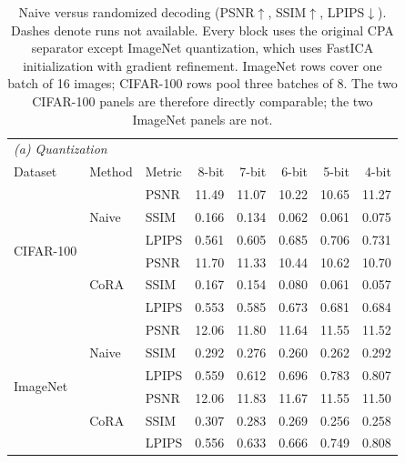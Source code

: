 \documentclass{article}
\newcommand{\cora}{CoRA}
\begin{document}
\begin{table}[!t]
\centering
\caption{Naive versus randomized decoding (PSNR$\uparrow$, SSIM$\uparrow$,
LPIPS$\downarrow$). Dashes denote runs not available. Every block uses the
original CPA separator except ImageNet quantization, which uses FastICA
initialization with gradient refinement. ImageNet rows cover one batch of 16
images; CIFAR-100 rows pool three batches of 8. The two CIFAR-100 panels are
therefore directly comparable; the two ImageNet panels are not.}
\label{tab:compression}
\small
\setlength{\tabcolsep}{0.5pt}
\renewcommand{\arraystretch}{1.0}

\begin{tabular*}{\columnwidth}{@{\extracolsep{\fill}}lllrrrrr@{}}
\toprule
\multicolumn{8}{l}{\textit{(a) Quantization}}\\
Dataset & Method & Metric & 8-bit & 7-bit & 6-bit & 5-bit & 4-bit\\
\midrule
\multirow{6}{*}{CIFAR-100} & \multirow{3}{*}{Naive} & PSNR & 11.49 & 11.07 & 10.22 & 10.65 & 11.27\\
 &  & SSIM & 0.166 & 0.134 & 0.062 & 0.061 & 0.075\\
 &  & LPIPS & 0.561 & 0.605 & 0.685 & 0.706 & 0.731\\
 & \multirow{3}{*}{\cora{}} & PSNR & 11.70 & 11.33 & 10.44 & 10.62 & 10.70\\
 &  & SSIM & 0.167 & 0.154 & 0.080 & 0.061 & 0.057\\
 &  & LPIPS & 0.553 & 0.585 & 0.673 & 0.681 & 0.684\\
\midrule
\multirow{6}{*}{ImageNet} & \multirow{3}{*}{Naive} & PSNR & 12.06 & 11.80 & 11.64 & 11.55 & 11.52\\
 &  & SSIM & 0.292 & 0.276 & 0.260 & 0.262 & 0.292\\
 &  & LPIPS & 0.559 & 0.612 & 0.696 & 0.783 & 0.807\\
 & \multirow{3}{*}{\cora{}} & PSNR & 12.06 & 11.83 & 11.67 & 11.55 & 11.50\\
 &  & SSIM & 0.307 & 0.283 & 0.269 & 0.256 & 0.258\\
 &  & LPIPS & 0.556 & 0.633 & 0.666 & 0.749 & 0.808\\
\bottomrule
\end{tabular*}


\end{table}
\end{document}
